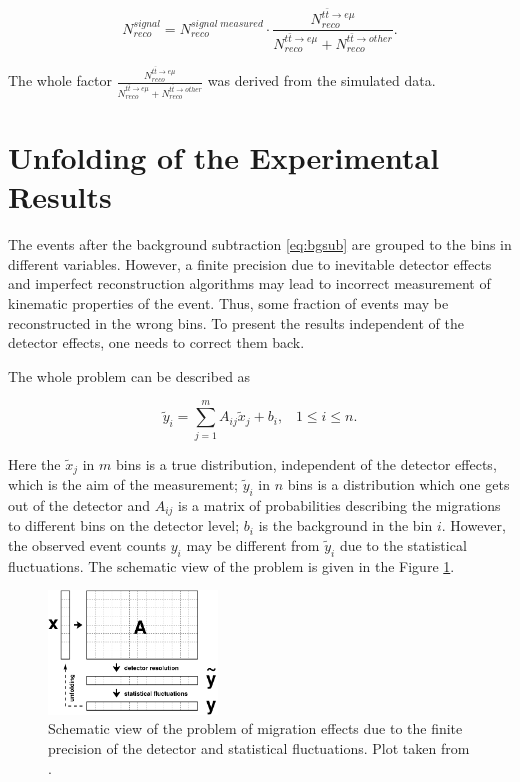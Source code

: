 \begin{equation}\label{eq:bgsub}
 N^{signal}_{reco} = N^{signal\;measured}_{reco} \cdot \frac{N^{t\bar{t} \rightarrow e\mu}_{reco}}{N^{t\bar{t} \rightarrow e\mu}_{reco} + N^{t\bar{t} \rightarrow other}_{reco}}.
\end{equation}

The whole factor $\frac{N^{t\bar{t} \rightarrow e\mu}_{reco}}{N^{t\bar{t} \rightarrow e\mu}_{reco} + N^{t\bar{t} \rightarrow other}_{reco}}$ was derived
from the simulated data.

\section{Unfolding of the Experimental Results}\label{sec:unfold}

The events after the background  subtraction \ref{eq:bgsub} are grouped to the bins in different variables. However, a finite precision
due to inevitable detector effects and imperfect reconstruction algorithms may lead to incorrect measurement of kinematic properties of the event.
Thus, some fraction of events may be reconstructed in the wrong bins. To present the results independent of the detector effects,
one needs to correct them back.

The whole problem can be described as

\begin{equation}\label{eq:UnfoldProb}
 \tilde{y}_i = \sum_{j = 1}^{m} A_{ij}\tilde{x}_{j} + b_{i}, \;\;\; 1 \leq i \leq n.
\end{equation}

Here the $\tilde{x}_j$ in $m$ bins is a true distribution, independent of the detector effects, which is the aim of the measurement;
$\tilde{y}_i$ in $n$ bins is a distribution which one gets out of the detector and $A_{ij}$ is a matrix of probabilities describing 
the migrations to different bins on the detector level; $b_{i}$ is the background in the bin $i$. 
However, the observed event counts $y_{i}$ may be different from $\tilde{y}_{i}$ due to the statistical fluctuations.
The schematic view of the problem is given in the Figure \ref{fig:scUnf}.

\begin{figure}[t]
  \centering
  \includegraphics[width=0.4\textwidth]{06_DiffXsec/plots/d12-129f1.png}
  \caption{Schematic view of the problem of migration effects due to the finite precision of the detector and statistical 
  fluctuations. Plot taken from \cite{Schmitt:2012kp}.}
  \label{fig:scUnf}
\end{figure}

